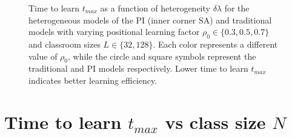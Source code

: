 \begin{figure}[htbp!]
   \centering
   \caption[Heterogeneity $\delta\lambda$ dependence of time to learn $t_{max}$ for the heterogeneous classroom model]{Time to learn $t_{max}$ as a function of heterogeneity $\delta\lambda$ for the heterogeneous models of the PI (inner corner SA) and traditional models with varying positional learning factor $\rho_0\in\lbrace 0.3,0.5,0.7 \rbrace$ and classroom sizes $L\in\lbrace32,128\rbrace$. 
   Each color represents a different value of $\rho_0$, while the circle and square symbols represent the traditional and PI models respectively.
   Lower time to learn $t_{max}$ indicates better learning efficiency.
   }
   \label{fig:2DBPCAIH dl-t plots}
\end{figure}

\newpage %

\section{Time to learn $t_{max}$ vs class size $N$}\label{sec:BPCAIH m vs dl}

